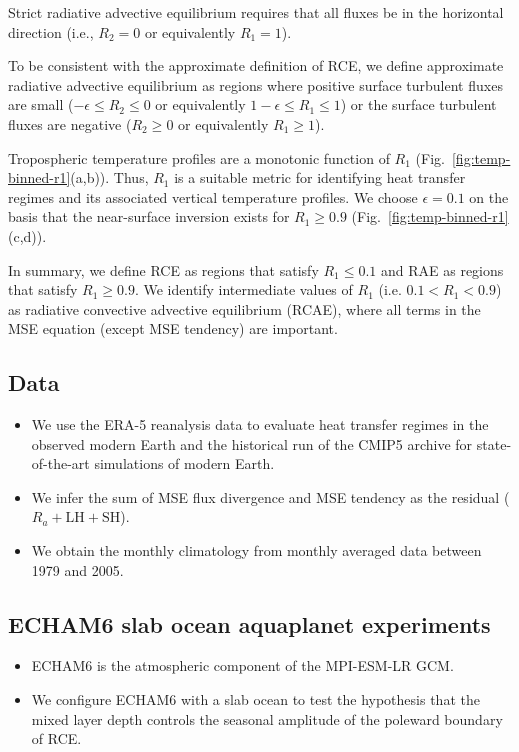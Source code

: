 \documentclass{ametsocV5}
\begin{document}
    Strict radiative advective equilibrium requires that all fluxes be in the horizontal direction (i.e., \(R_{2}=0\) or equivalently \(R_{1}=1\)).
    
    To be consistent with the approximate definition of RCE, we define approximate radiative advective equilibrium as regions where positive surface turbulent fluxes are small (\(-\epsilon \le R_{2} \le 0 \) or equivalently \(1-\epsilon \le R_{1} \le 1\)) or the surface turbulent fluxes are negative (\(R_{2} \ge 0 \) or equivalently \(R_{1} \ge 1\)).
    
    Tropospheric temperature profiles are a monotonic function of $R_{1}$ (Fig.~\ref{fig:temp-binned-r1}(a,b)). Thus, $R_{1}$ is a suitable metric for identifying heat transfer regimes and its associated vertical temperature profiles. We choose $\epsilon=0.1$ on the basis that the near-surface inversion exists for $R_{1} \ge 0.9$ (Fig.~\ref{fig:temp-binned-r1}(c,d)).
    
    In summary, we define RCE as regions that satisfy \(R_{1}\le 0.1\) and RAE as regions that satisfy \(R_{1}\ge 0.9\). We identify intermediate values of \(R_{1}\) (i.e. \(0.1 < R_{1} < 0.9\)) as radiative convective advective equilibrium (RCAE), where all terms in the MSE equation (except MSE tendency) are important.

\subsection{Data}
\begin{itemize}
  \item We use the ERA-5 reanalysis data to evaluate heat transfer regimes in the observed modern Earth and the historical run of the CMIP5 archive for state-of-the-art simulations of modern Earth.
  \item We infer the sum of MSE flux divergence and MSE tendency as the residual ($R_{a}+\mathrm{LH+SH}$).
  \item We obtain the monthly climatology from monthly averaged data between 1979 and 2005.
\end{itemize}

\subsection{ECHAM6 slab ocean aquaplanet experiments}
\begin{itemize}
  \item ECHAM6 is the atmospheric component of the MPI-ESM-LR GCM.
  \item We configure ECHAM6 with a slab ocean to test the hypothesis that the mixed layer depth controls the seasonal amplitude of the poleward boundary of RCE.
\end{itemize}
\end{document}
